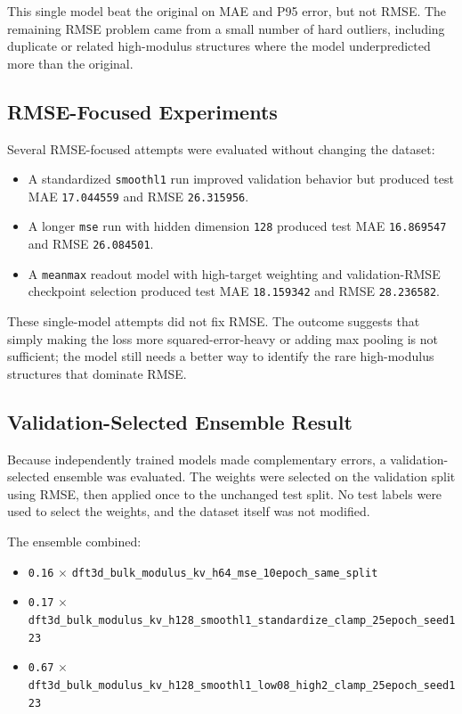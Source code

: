 \documentclass[11pt]{article}
\begin{document}
This single model beat the original on MAE and P95 error, but not RMSE.  The remaining RMSE problem came from a small number of hard outliers, including duplicate or related high-modulus structures where the model underpredicted more than the original.

\subsection{RMSE-Focused Experiments}

Several RMSE-focused attempts were evaluated without changing the dataset:
\begin{itemize}
  \item A standardized \texttt{smoothl1} run improved validation behavior but produced test MAE \texttt{17.044559} and RMSE \texttt{26.315956}.
  \item A longer \texttt{mse} run with hidden dimension \texttt{128} produced test MAE \texttt{16.869547} and RMSE \texttt{26.084501}.
  \item A \texttt{meanmax} readout model with high-target weighting and validation-RMSE checkpoint selection produced test MAE \texttt{18.159342} and RMSE \texttt{28.236582}.
\end{itemize}

These single-model attempts did not fix RMSE.  The outcome suggests that simply making the loss more squared-error-heavy or adding max pooling is not sufficient; the model still needs a better way to identify the rare high-modulus structures that dominate RMSE.

\subsection{Validation-Selected Ensemble Result}

Because independently trained models made complementary errors, a validation-selected ensemble was evaluated.  The weights were selected on the validation split using RMSE, then applied once to the unchanged test split.  No test labels were used to select the weights, and the dataset itself was not modified.

The ensemble combined:
\begin{itemize}
  \item \texttt{0.16} $\times$ \texttt{dft3d\_bulk\_modulus\_kv\_h64\_mse\_10epoch\_same\_split}
  \item \texttt{0.17} $\times$ \texttt{dft3d\_bulk\_modulus\_kv\_h128\_smoothl1\_standardize\_clamp\_25epoch\_seed123}
  \item \texttt{0.67} $\times$ \texttt{dft3d\_bulk\_modulus\_kv\_h128\_smoothl1\_low08\_high2\_clamp\_25epoch\_seed123}
\end{itemize}
\end{document}
